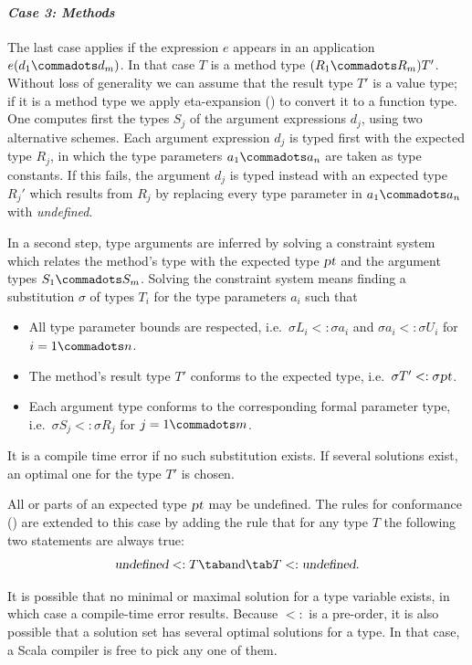 \paragraph{\em Case 3: Methods} The last case applies if the expression
$e$ appears in an application $e(d_1 \commadots d_m)$. In that case
$T$ is a method type $(R_1 \commadots R_m)T'$. Without loss of
generality we can assume that the result type $T'$ is a value type; if
it is a method type we apply eta-expansion () to
convert it to a function type.  One computes first the types $S_j$ of
the argument expressions $d_j$, using two alternative schemes.  Each
argument expression $d_j$ is typed first with the expected type $R_j$,
in which the type parameters $a_1 \commadots a_n$ are taken as type
constants.  If this fails, the argument $d_j$ is typed instead with an
expected type $R_j'$ which results from $R_j$ by replacing every type
parameter in $a_1 \commadots a_n$ with {\sl undefined}.

In a second step, type arguments are inferred by solving a constraint
system which relates the method's type with the expected type
$\mbox{\sl pt}$ and the argument types $S_1 \commadots S_m$. Solving the
constraint system means
finding a substitution $\sigma$ of types $T_i$ for the type parameters
$a_i$ such that
\begin{itemize}
\item 
All type parameter bounds are respected, i.e.\ 
$\sigma L_i <: \sigma a_i$ and $\sigma a_i <: \sigma U_i$ for $i = 1 \commadots n$.
\item 
The method's result type $T'$ conforms to the expected type, i.e.\ 
$\sigma T' <: \sigma \mbox{\sl pt}$.
\item
Each argument type conforms to the corresponding formal parameter
type, i.e.\ 
$\sigma S_j <: \sigma R_j$ for $j = 1 \commadots m$.
\end{itemize}
It is a compile time error if no such substitution exists.  If several
solutions exist, an optimal one for the type $T'$ is chosen.

All or parts of an expected type $\mbox{\sl pt}$ may be undefined. The rules for
conformance (\sref{sec:conformance}) are extended to this case by adding
the rule that for any type $T$ the following two statements are always
true:
\[
   \mbox{\sl undefined} <: T \tab\mbox{and}\tab T <: \mbox{\sl undefined} .
\]

It is possible that no minimal or maximal solution for a type variable
exists, in which case a compile-time error results. Because $<:$ is a
pre-order, it is also possible that a solution set has several optimal
solutions for a type. In that case, a Scala compiler is free to pick
any one of them.

